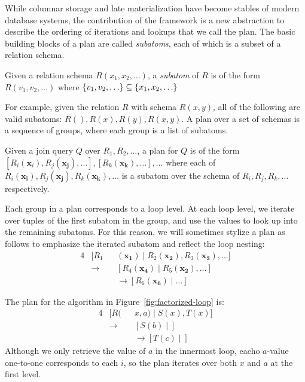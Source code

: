 While columnar storage and late materialization have become stables of
modern database systems,
the contribution of the \FJ framework is a new abstraction
to describe the ordering of iterations and lookups
that we call the \FJ plan.
The basic building blocks of a \FJ plan are
called {\em subatoms}, each of which is a subset of a relation schema.
%
\begin{definition}
  Given a relation schema $R(x_1, x_2, \ldots)$,
  a \emph{subatom} of $R$ is of the form $R(v_1, v_2, \ldots)$
  where $\{v_1, v_2, \ldots\} \subseteq \{x_1, x_2, \ldots\}$
\end{definition}
%
For example, given the relation $R$ with schema $R(x, y)$,
all of the following are valid subatoms: $R(), R(x), R(y), R(x, y)$.
A \FJ plan over a set of schemas is a sequence of groups,
where each group is a list of subatoms.
%
\begin{definition}
  Given a join query $Q$ over $R_1, R_2, \ldots$,
  a \FJ plan for $Q$ is of the form $[R_i(\mathbf{x}_i), R_j(\mathbf{x_j}), \ldots],
    [R_k(\mathbf{x_k}), \ldots], \ldots$ where each of
  $R_i(\mathbf{x_i}), R_j(\mathbf{x_j}), R_k(\mathbf{x_k}), \ldots$
  is a subatom over the schema of $R_i, R_j, R_k, \ldots$ respectively.
\end{definition}
%
Each group in a \FJ plan corresponds to a loop level.
At each loop level,
we iterate over tuples of the first subatom in the group,
and use the values to look up into the remaining subatoms.
For this reason, we will sometimes stylize a \FJ plan as follows
to emphasize the iterated subatom and reflect the loop nesting:
\begin{alignat*}{4}
   & [R_1        &  & (\mathbf{x_1})\mid R_2(\mathbf{x_2}), R_3(\mathbf{x_3}), \ldots] \\
   & \rightarrow &  & [R_4(\mathbf{x_4})\mid R_5(\mathbf{x_2}), \ldots]                \\
   &             &  & \rightarrow [R_6(\mathbf{x_6})\mid \ldots]
\end{alignat*}
%
\begin{example}
  The \FJ plan for the algorithm in Figure~\ref{fig:factorized-loop}
  is:
  \begin{alignat*}{4}
     & [R(         &  & x, a) \mid S(x), T(x)]   \\
     & \rightarrow &  & [S(b) \mid ]             \\
     &             &  & \rightarrow [T(c) \mid ]
  \end{alignat*}
  Although we only retrieve the value of $a$ in the innermost loop,
  eacho $a$-value one-to-one corresponds to each $i$,
  so the plan iterates over both $x$ and $a$ at the first level.
\end{example}
